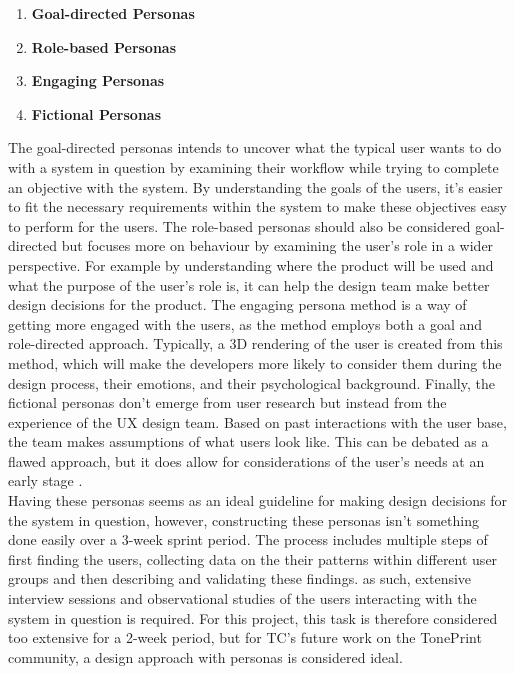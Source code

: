 %
\begin{enumerate}
    \item \textbf{Goal-directed Personas}
    \item \textbf{Role-based Personas}
    \item \textbf{Engaging Personas}
    \item \textbf{Fictional Personas}
\end{enumerate}
%
\noindent
The goal-directed personas intends to uncover what the typical user wants to do with a system in question by examining their workflow while trying to complete an objective with the system. By understanding the goals of the users, it's easier to fit the necessary requirements within the system to make these objectives easy to perform for the users. The role-based personas should also be considered goal-directed but focuses more on behaviour by examining the user's role in a wider perspective. For example by understanding where the product will be used and what the purpose of the user's role is, it can help the design team make better design decisions for the product. The engaging persona method is a way of getting more engaged with the users, as the method employs both a goal and role-directed approach. Typically, a 3D rendering of the user is created from this method, which will make the developers more likely to consider them during the design process, their emotions, and their psychological background. Finally, the fictional personas don't emerge from user research but instead from the experience of the UX design team. Based on past interactions with the user base, the team makes assumptions of what users look like. This can be debated as a flawed approach, but it does allow for considerations of the user's needs at an early stage \parencite[][11]{WEB:PersonaKilde}.\\

\noindent
Having these personas seems as an ideal guideline for making design decisions for the system in question, however, constructing these personas isn't something done easily over a 3-week sprint period. The process includes multiple steps of first finding the users, collecting data on the their patterns within different user groups and then describing and validating these findings. as such, extensive interview sessions and observational studies of the users interacting with the system in question is required. For this project, this task is therefore considered too extensive for a 2-week period, but for TC's future work on the TonePrint community, a design approach with personas is considered ideal.

